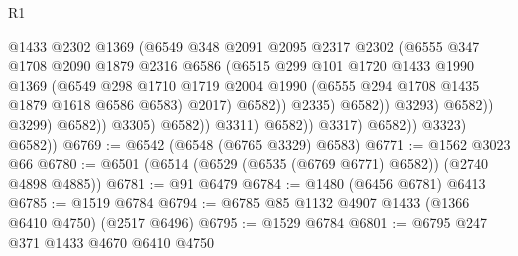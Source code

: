 \begin{lexlean}{R1}
\begin{coremodule}
                                            @1433
                                            @2302
                                            @1369
                                            (@6549
                                              @348
                                              @2091
                                              @2095
                                              @2317
                                              @2302
                                              (@6555
                                                @347
                                                @1708
                                                @2090
                                                @1879
                                                @2316
                                                @6586
                                                (@6515
                                                  @299
                                                  @101
                                                  @1720
                                                  @1433
                                                  @1990
                                                  @1369
                                                  (@6549
                                                    @298
                                                    @1710
                                                    @1719
                                                    @2004
                                                    @1990
                                                    (@6555 @294 @1708 @1435 @1879 @1618 @6586 @6583)
                                                    @2017)
                                                  @6582))
                                              @2335)
                                            @6582))
                                        @3293)
                                      @6582))
                                  @3299)
                                @6582))
                            @3305)
                          @6582))
                      @3311)
                    @6582))
                @3317)
              @6582))
          @3323)
        @6582))
@6769 := @6542 (@6548 (@6765 @3329) @6583)
@6771 := @1562 @3023 @66
@6780 := @6501 (@6514 (@6529 (@6535 (@6769 @6771) @6582)) (@2740 @4898 @4885))
@6781 := @91 @6479
@6784 := @1480 (@6456 @6781) @6413
@6785 := @1519 @6784
@6794 := @6785 @85 @1132 @4907 @1433 (@1366 @6410 @4750) (@2517 @6496)
@6795 := @1529 @6784
@6801 := @6795 @247 @371 @1433 @4670 @6410 @4750

\end{coremodule}
\end{lexlean}
